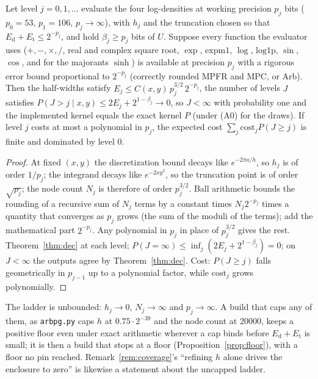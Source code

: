 \begin{proposition}\label{prop:ladder}
Let level $j=0,1,\dots$ evaluate the four log-densities at working precision $p_j$ bits ($p_0=53$, $p_1=106$,
$p_j\to\infty$), with $h_j$ and the truncation chosen so that $E_{\mathrm d}+E_{\mathrm t}\le2^{-p_j}$, and hold
$\beta_j\ge p_j$ bits of $U$. Suppose every function the evaluator uses ($+,-,\times,/$, real and complex square
root, $\exp$, $\mathrm{expm1}$, $\log$, $\mathrm{log1p}$, $\sin$, $\cos$, and for the majorants $\sinh$) is
available at precision $p_j$ with a rigorous error bound proportional to $2^{-p_j}$ (correctly rounded MPFR and
MPC, or Arb). Then the half-widths satisfy $E_j\le C(x,y)\,p_j^{3/2}\,2^{-p_j}$, the number of levels $J$ satisfies
$P(J>j\mid x,y)\le2E_j+2^{1-\beta_j}\to0$, so $J<\infty$ with probability one and the implemented kernel equals
the exact kernel $P$ (under (A0) for the draws). If level $j$ costs at most a polynomial in $p_j$, the expected
cost $\sum_j\mathrm{cost}_jP(J\ge j)$ is finite and dominated by level 0.
\end{proposition}
\begin{proof}
At fixed $(x,y)$ the discretization bound decays like $e^{-2\pi a/h}$, so $h_j$ is of order $1/p_j$; the
integrand decays like $e^{-2xy^2}$, so the truncation point is of order $\sqrt{p_j}$; the node count $N_j$ is
therefore of order $p_j^{3/2}$. Ball arithmetic bounds the rounding of a recursive sum of $N_j$ terms by a constant
times $N_j2^{-p_j}$ times a quantity that converges as $p_j$ grows (the sum of the moduli of the terms); add the
mathematical part $2^{-p_j}$. Any polynomial in $p_j$ in place of $p_j^{3/2}$ gives the rest.
Theorem~\ref{thm:dec} at each level; $P(J=\infty)\le\inf_j(2E_j+2^{1-\beta_j})=0$; on $J<\infty$ the outputs agree
by Theorem~\ref{thm:dec}. Cost: $P(J\ge j)$ falls geometrically in $p_{j-1}$ up to a polynomial factor, while
$\mathrm{cost}_j$ grows polynomially.
\end{proof}

The ladder is unbounded: $h_j\to0$, $N_j\to\infty$ and $p_j\to\infty$. A build that caps any of them, as
\texttt{arbpg.py} caps $h$ at $0.75\cdot2^{-39}$ and the node count at 20000, keeps a positive floor even under
exact arithmetic wherever a cap binds before $E_{\mathrm d}+E_{\mathrm t}$ is small; it is then a build that stops at a
floor (Proposition~\ref{prop:floor}), with a floor no pin reached. Remark~\ref{rem:coverage}'s ``refining $h$
alone drives the enclosure to zero'' is likewise a statement about the uncapped ladder.

